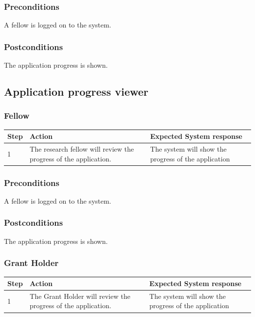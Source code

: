 \documentclass[12pt]{article}
\begin{document}
\subsubsection*{Preconditions}
A fellow is logged on to the system.

\subsubsection*{Postconditions}
The application progress is shown.

\subsection{Application progress viewer}
\subsubsection{Fellow}

\begin{center}
\begin{tabular}{|l|p{6cm}|p{8cm}|}
\hline
Step & Action & Expected System response \\
\hline
1 & The research fellow will review the progress of the application. & The system will show the progress of the application \\
\hline
\end{tabular}
\end{center}

\subsubsection*{Preconditions}
A fellow is logged on to the system.

\subsubsection*{Postconditions}
The application progress is shown.

\subsubsection{Grant Holder}

\begin{center}
\begin{tabular}{|l|p{6cm}|p{8cm}|}
\hline
Step & Action & Expected System response \\
\hline
1 & The Grant Holder will review the progress of the application. & The system will show the progress of the application \\
\hline
\end{tabular}
\end{center}
\end{document}
